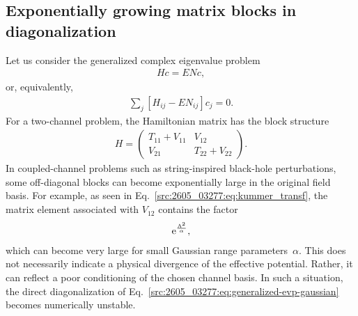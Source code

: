 \subsection{Exponentially growing matrix blocks in diagonalization}\label{src:2605_03277:sec:balance}
Let us consider the generalized complex eigenvalue problem
\begin{align}
    H c = E N c ,
    \label{src:2605_03277:eq:generalized-evp-gaussian}
\end{align}
or, equivalently,
\begin{align}
    \sum_j
    \left[
        H_{ij}-E N_{ij}
    \right] c_j
    =0 .
\end{align}
For a two-channel problem, the Hamiltonian matrix has the block structure
\begin{align}
    H
    =
    \begin{pmatrix}
        T_{11}+V_{11} & V_{12} \\
        V_{21}        & T_{22}+V_{22}
    \end{pmatrix}.
\end{align}
In coupled-channel problems such as string-inspired black-hole perturbations,
some off-diagonal blocks can become exponentially large in the original field
basis.
For example, as seen in Eq.~\eqref{src:2605_03277:eq:kummer_transf}, the matrix element
associated with $V_{12}$ contains the factor
\begin{align}
    \mathrm{e}^{\frac{\Lambda^2}{\alpha}},
\end{align}
which can become very large for small Gaussian range parameters~$\alpha$.
This does not necessarily indicate a physical divergence of the effective
potential.
Rather, it can reflect a poor conditioning of the chosen channel basis.
In such a situation, the direct diagonalization of Eq.~\eqref{src:2605_03277:eq:generalized-evp-gaussian}
becomes numerically unstable.
